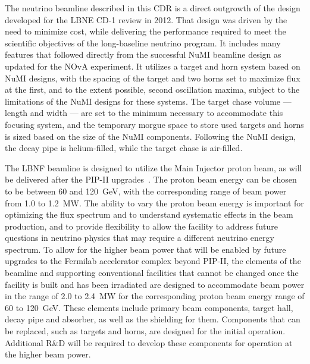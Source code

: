  
The neutrino beamline described in this CDR is a direct outgrowth of the design~\cite{lbnecdr} developed for the LBNE
CD-1 review in 2012.  That design was driven by the need to minimize cost, while delivering the performance required to meet the scientific objectives of the long-baseline neutrino program.  It includes many features that followed directly from the 
successful NuMI beamline design as updated for the NOvA experiment.  It utilizes a target and horn system based on NuMI designs, with the spacing of the target and two horns set to maximize flux at the first, and to the extent possible, second 
oscillation maxima, subject to the limitations of  the NuMI designs for these systems.  The target chase volume --- length and width --- are set to the minimum necessary to accommodate this focusing system, and the temporary morgue space to store 
used targets and horns is sized based on the size of the NuMI components.  Following the NuMI design, the decay pipe is helium-filled, while the target chase is air-filled.  
 
The LBNF beamline is designed to utilize the Main Injector proton beam, as will be delivered after the PIP-II upgrades~\cite{pip2-2013}.  
The  proton beam energy can be chosen to be between 60 and 120~GeV, with the corresponding range of beam power from 1.0 to 1.2~MW.
The ability to vary the 
proton beam energy is important for optimizing the flux spectrum and to understand systematic effects in the beam production, and to provide flexibility to allow the facility to address future questions in neutrino physics that may require a 
different neutrino energy spectrum.  To allow for the higher beam power that will be enabled by future upgrades to the Fermilab accelerator complex beyond PIP-II, the elements of the beamline and supporting conventional facilities that cannot be changed once 
the facility is built and has been irradiated are designed to accommodate beam power in the range of 2.0 to 2.4~MW for the corresponding proton beam energy range of 60 to 120~GeV.  These elements include primary beam components, target hall, decay pipe and absorber, as 
well as the shielding for them.  Components that can be replaced, such as targets and horns, are designed for the  initial operation.  %
Additional R\&D
will be required to develop these components %
for operation at the higher beam power. 

